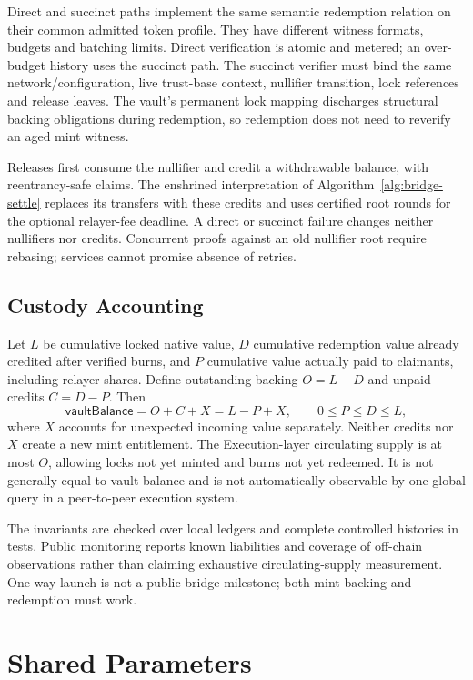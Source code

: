 Direct and succinct paths implement the same semantic redemption relation on their common admitted token profile. They have different witness formats, budgets and batching limits. Direct verification is atomic and metered; an over-budget history uses the succinct path. The succinct verifier must bind the same network/configuration, live trust-base context, nullifier transition, lock references and release leaves. The vault's permanent lock mapping discharges structural backing obligations during redemption, so redemption does not need to reverify an aged mint witness.

Releases first consume the nullifier and credit a withdrawable balance, with reentrancy-safe claims. The enshrined interpretation of Algorithm~\ref{alg:bridge-settle} replaces its transfers with these credits and uses certified root rounds for the optional relayer-fee deadline. A direct or succinct failure changes neither nullifiers nor credits. Concurrent proofs against an old nullifier root require rebasing; services cannot promise absence of retries.

\subsection{Custody Accounting}

Let $L$ be cumulative locked native value, $D$ cumulative redemption value already credited after verified burns, and $P$ cumulative value actually paid to claimants, including relayer shares. Define outstanding backing $O=L-D$ and unpaid credits $C=D-P$. Then
\[
 \mathsf{vaultBalance}=O+C+X=L-P+X,\qquad 0\le P\le D\le L,
\]
where $X$ accounts for unexpected incoming value separately. Neither credits nor $X$ create a new mint entitlement. The Execution-layer circulating supply is at most $O$, allowing locks not yet minted and burns not yet redeemed. It is not generally equal to vault balance and is not automatically observable by one global query in a peer-to-peer execution system.

The invariants are checked over local ledgers and complete controlled histories in tests. Public monitoring reports known liabilities and coverage of off-chain observations rather than claiming exhaustive circulating-supply measurement. One-way launch is not a public bridge milestone; both mint backing and redemption must work.

\section{Shared Parameters}\label{app:bridging-params}

